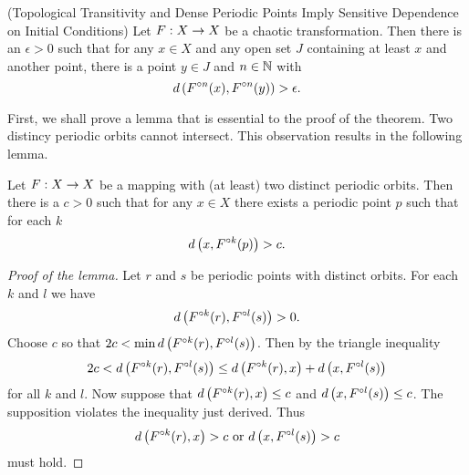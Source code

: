 \documentclass[12pt,draft,twoside]{book}
\begin{document}
  \begin{theorem}
    (Topological Transitivity and Dense Periodic Points Imply Sensitive Dependence on Initial Conditions)
    Let $F: X\rightarrow X$ be a chaotic transformation. Then there is an $\epsilon > 0$ such that
    for any $x\in X$ and any open set $J$ containing at least $x$ and another point, there is
    a point $y\in J$ and $n\in \mathbb{N}$ with
    \begin{equation*}
      d\left( F^{\circ n}(x),F^{\circ n}(y) \right) > \epsilon.
    \end{equation*}
    \label{thm:banks}
  \end{theorem}
  First, we shall prove a lemma that is essential to the proof of the theorem.
  Two distincy periodic orbits cannot intersect.
  This observation results in the following lemma.
  \begin{lemma}
    Let $F: X\rightarrow X$ be a mapping with (at least) two distinct periodic orbits.
    Then there is a $c > 0$ such that for any $x\in X$ there exists a periodic
    point $p$ such that for each $k$
    \begin{equation*}
      d\left( x, F^{\circ k}(p) \right) > c.
    \end{equation*}
    \label{lem:dev1}
  \begin{proof}[Proof of the lemma]
    Let $r$ and $s$ be periodic points with distinct orbits. For each $k$ and $l$ we have
    \begin{equation*}
      d\left( F^{\circ k}(r), F^{\circ l}(s) \right) > 0.
    \end{equation*}
    Choose $c$ so that $2c < \min d\left( F^{\circ k}(r),F^{\circ l}(s) \right)$.
    Then by the triangle inequality
    \begin{equation*}
      2c < d\left( F^{\circ k}(r),F^{\circ l}(s) \right) \leq d\left( F^{\circ k}(r),x \right) + d\left( x,F^{\circ l}(s) \right)
    \end{equation*}
    for all $k$ and $l$.
    Now suppose that $d\left( F^{\circ k}(r),x \right) \leq c$ and $d\left( x,F^{\circ l}(s) \right) \leq c$. The supposition
    violates the inequality just derived. Thus 
    \begin{equation*}
      d\left( F^{\circ k}(r),x \right) > c \mbox{ or } d\left( x,F^{\circ l}(s) \right) > c
    \end{equation*}
    must hold.
  \end{proof}
  \end{lemma}
\end{document}
